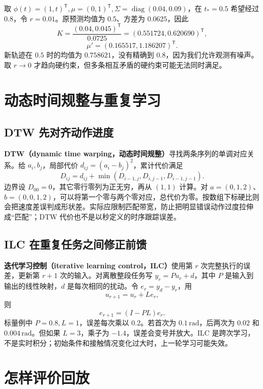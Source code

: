 取 $\phi(t)=(1,t)^\mathsf T,\mu=(0,1)^\mathsf T,\Sigma=\operatorname{diag}(0.04,0.09)$，在 $t_*=0.5$ 希望经过 $0.8$，令 $r=0.01$。原预测均值为 $0.5$、方差为 $0.0625$，因此
\[
K=\frac{(0.04,0.045)^\mathsf T}{0.0725}
=(0.551724,0.620690)^\mathsf T,
\]
\[
\mu'=(0.165517,1.186207)^\mathsf T.
\]
新轨迹在 $0.5$ 时的均值为 $0.758621$，没有精确到 $0.8$，因为我们允许观测有噪声。取 $r\to0$ 才趋向硬约束，但多条相互矛盾的硬约束可能无法同时满足。

\section{动态时间规整与重复学习}

\subsection{DTW 先对齐动作进度}

\textbf{DTW（dynamic time warping，动态时间规整）}寻找两条序列的单调对应关系。给 $a_i,b_j$，局部代价 $d_{ij}=(a_i-b_j)^2$，累计代价满足
\begin{equation}
D_{ij}=d_{ij}+\min(D_{i-1,j},D_{i,j-1},D_{i-1,j-1}).
\end{equation}
边界设 $D_{00}=0$，其它零行零列为正无穷，再从 $(1,1)$ 计算。对 $a=(0,1,2)$、$b=(0,0,1,2)$，可以将第一个零与两个零对应，总代价为零。按数组下标硬比则会把速度差误判成形状差。实际应限制匹配带宽，防止把明显错误动作过度拉伸成“匹配”；DTW 代价也不是以秒定义的时序跟踪误差。

\subsection{ILC 在重复任务之间修正前馈}

\textbf{迭代学习控制（iterative learning control，ILC）}使用第 $r$ 次完整执行的误差，更新第 $r+1$ 次的输入。对离散整段任务写 $y_r=Pu_r+d$，其中 $P$ 是输入到输出的线性映射，$d$ 是每次相同的扰动。令 $e_r=y_d-y_r$，用
\begin{equation}
u_{r+1}=u_r+Le_r,
\end{equation}
则
\begin{equation}
e_{r+1}=(I-PL)e_r.
\end{equation}
标量例中 $P=0.8,L=1$，误差每次乘以 $0.2$。若首次为 $0.1\,\mathrm{rad}$，后两次为 $0.02$ 和 $0.004\,\mathrm{rad}$。但如果 $L=3$，乘子为 $-1.4$，误差会变号并放大。ILC 是跨次学习，不是实时积分；初始条件和接触情况变化过大时，上一轮学习可能失效。

\section{怎样评价回放}


